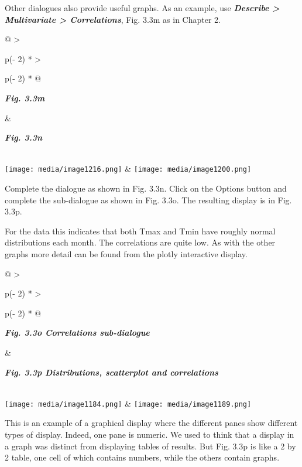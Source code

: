 \documentclass[
  letterpaper,
  DIV=11,
  numbers=noendperiod]{scrreprt}
\begin{document}
Other dialogues also provide useful graphs. As an example, use
\textbf{\emph{Describe \textgreater{} Multivariate \textgreater{}
Correlations}}, Fig. 3.3m as in Chapter 2.

\begin{longtable}[]{@{}
  >{\raggedright\arraybackslash}p{(\columnwidth - 2\tabcolsep) * }
  >{\raggedright\arraybackslash}p{(\columnwidth - 2\tabcolsep) * }@{}}
\toprule\noalign{}
\begin{minipage}[b]{\linewidth}\raggedright
\textbf{\emph{Fig. 3.3m}}
\end{minipage} & \begin{minipage}[b]{\linewidth}\raggedright
\textbf{\emph{Fig. 3.3n}}
\end{minipage} \\
\midrule\noalign{}
\endhead
\bottomrule\noalign{}
\endlastfoot
\texttt{[image: media/image1216.png]}
&
\texttt{[image: media/image1200.png]} \\
\end{longtable}

Complete the dialogue as shown in Fig. 3.3n. Click on the Options button
and complete the sub-dialogue as shown in Fig. 3.3o. The resulting
display is in Fig. 3.3p.

For the data this indicates that both Tmax and Tmin have roughly normal
distributions each month. The correlations are quite low. As with the
other graphs more detail can be found from the plotly interactive
display.

\begin{longtable}[]{@{}
  >{\raggedright\arraybackslash}p{(\columnwidth - 2\tabcolsep) * }
  >{\raggedright\arraybackslash}p{(\columnwidth - 2\tabcolsep) * }@{}}
\toprule\noalign{}
\begin{minipage}[b]{\linewidth}\raggedright
\textbf{\emph{Fig. 3.3o Correlations sub-dialogue}}
\end{minipage} & \begin{minipage}[b]{\linewidth}\raggedright
\textbf{\emph{Fig. 3.3p Distributions, scatterplot and correlations}}
\end{minipage} \\
\midrule\noalign{}
\endhead
\bottomrule\noalign{}
\endlastfoot
\texttt{[image: media/image1184.png]}
&
\texttt{[image: media/image1189.png]} \\
\end{longtable}

This is an example of a graphical display where the different panes show
different types of display. Indeed, one pane is numeric. We used to
think that a display in a graph was distinct from displaying tables of
results. But Fig. 3.3p is like a 2 by 2 table, one cell of which
contains numbers, while the others contain graphs.
\end{document}
